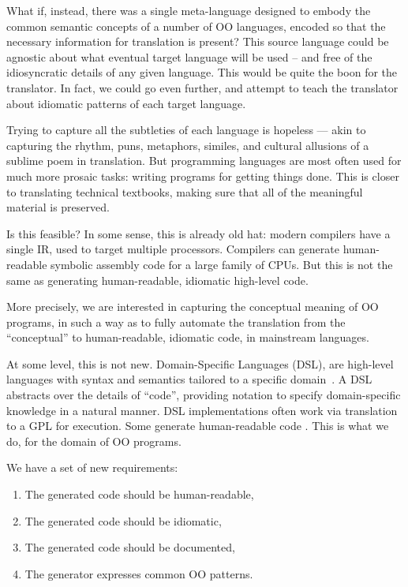 \documentclass[sigplan,review,prologue,dvipsnames]{acmart}
\begin{document}
What if, instead, there was a single meta-language designed to embody
the common semantic concepts of a number of OO languages, encoded so that the
necessary information for translation is present?  This source language could
be agnostic about what eventual target language will be used -- and free of
the idiosyncratic details of any given language.  This would be quite the boon
for the translator.  In fact, we could go even further, and attempt to
teach the translator about idiomatic patterns of each target language.

Trying to capture all the subtleties of each language is hopeless ---
akin to capturing the rhythm, puns, metaphors, similes,
and cultural allusions of a sublime poem in translation.  But programming
languages are most often used for much more prosaic tasks: writing programs
for getting things done. This is closer to translating technical textbooks,
making sure that all of the meaningful material is preserved.

Is this feasible? In some sense, this is already old hat:
modern compilers have a single IR,
used to target multiple processors. Compilers can generate
human-readable symbolic assembly code for a large family of CPUs. But this
is not the same as generating human-readable, idiomatic high-level
code.

More precisely, we are interested in capturing the conceptual meaning of
OO programs, in such a way as to fully automate the translation from
the ``conceptual'' to human-readable, idiomatic code, in mainstream
languages.

At some level, this is not new.  Domain-Specific Languages (DSL),
are high-level languages with syntax and semantics tailored to a specific
domain~\cite{mernik2005and}.  A DSL
abstracts over the details of ``code'', providing notation to
specify domain-specific knowledge in a natural manner. DSL implementations
often work via translation to a GPL for execution.  Some generate
human-readable code \cite{wang1997zephyr, mooij2013gaining, hong2012green, 
beyak2011saga}.  This is what we do, for the domain of OO programs.

We have a set of new requirements:
\begin{enumerate}
\item The generated code should be human-readable,
\item The generated code should be idiomatic,
\item The generated code should be documented,
\item The generator expresses common OO patterns.
\end{enumerate}
\end{document}
